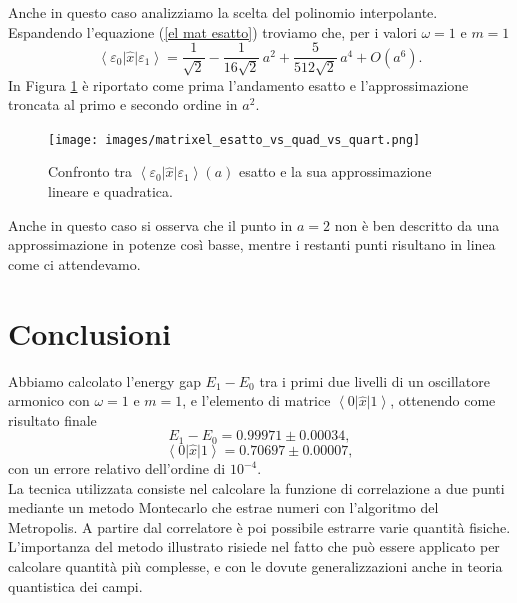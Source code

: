 \documentclass{article}
\begin{document}
Anche in questo caso analizziamo la scelta del polinomio interpolante. Espandendo l'equazione (\ref{el mat esatto}) troviamo che, per i valori $\omega=1$ e $m=1$
\begin{equation}
    \left<\varepsilon_0\right|\hat{x}\left|\varepsilon_1\right>=\frac{1}{\sqrt{2}}-\frac{1}{16\sqrt{2}}\,a^2+\frac{5}{512\sqrt{2}}\,a^4+O(a^6).
\end{equation}
In Figura \ref{grafico quadratico quartico matrice} è riportato come prima l'andamento esatto e l'approssimazione troncata al primo e secondo ordine in $a^2$.
\begin{figure}[h]
    \centering
    \texttt{[image: images/matrixel\_esatto\_vs\_quad\_vs\_quart.png]}
    \caption{Confronto tra $\left<\varepsilon_0\right|\hat{x}\left|\varepsilon_1\right>(a)$ esatto e la sua approssimazione lineare e quadratica.}
    \label{grafico quadratico quartico matrice}
\end{figure}

Anche in questo caso si osserva che il punto in $a=2$ non è ben descritto da una approssimazione in potenze così basse, mentre i restanti punti risultano in linea come ci attendevamo.

\section{Conclusioni}
Abbiamo calcolato l'energy gap $E_1-E_0$ tra i primi due livelli di un oscillatore armonico con $\omega=1$ e $m=1$, e l'elemento di matrice $\left<0\right|\hat{x}\left|1\right>$, ottenendo come risultato finale 
$$E_1-E_0=0.99971 \pm 0.00034,$$
$$\left<0\right|\hat{x}\left|1\right>=0.70697\pm 0.00007,$$
con un errore relativo dell'ordine di $10^{-4}$.\\
 La tecnica utilizzata consiste nel calcolare la funzione di correlazione a due punti mediante un metodo Montecarlo che estrae numeri con l'algoritmo del Metropolis. A partire dal correlatore è poi possibile estrarre varie quantità fisiche. L'importanza del metodo illustrato risiede nel fatto che può essere applicato per calcolare quantità più complesse, e con le dovute generalizzazioni anche in teoria quantistica dei campi.
\end{document}
